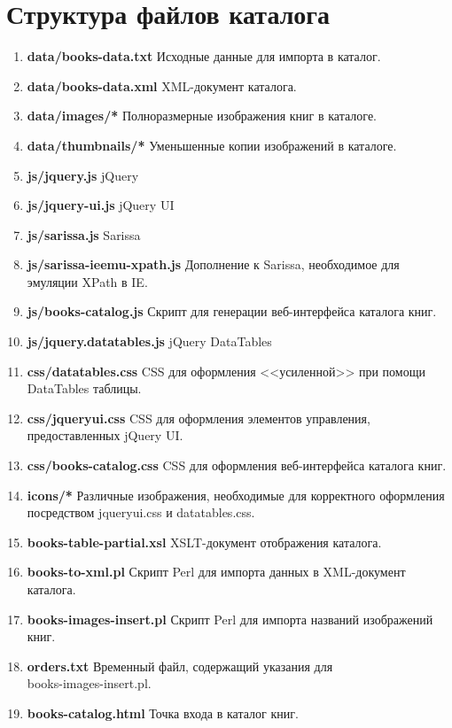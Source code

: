 \documentclass[a4paper,14pt,oneside]{extreport}
\begin{document}
\section{Структура файлов каталога}
\begin{enumerate}
\item \textbf{data/books-data.txt} Исходные данные для импорта в каталог.
\item \textbf{data/books-data.xml} XML-документ каталога.
\item \textbf{data/images/*} Полноразмерные изображения книг в каталоге.
\item \textbf{data/thumbnails/*} Уменьшенные копии изображений в каталоге.
\item \textbf{js/jquery.js} jQuery
\item \textbf{js/jquery-ui.js} jQuery UI
\item \textbf{js/sarissa.js} Sarissa
\item \textbf{js/sarissa-ieemu-xpath.js} Дополнение к Sarissa, необходимое для эмуляции XPath в IE.
\item \textbf{js/books-catalog.js} Скрипт для генерации веб-интерфейса каталога книг.
\item \textbf{js/jquery.datatables.js} jQuery DataTables
\item \textbf{css/datatables.css} CSS для оформления <<усиленной>> при помощи \\ DataTables таблицы.
\item \textbf{css/jqueryui.css} CSS для оформления элементов управления, предоставленных jQuery UI.
\item \textbf{css/books-catalog.css} CSS для оформления веб-интерфейса каталога книг.
\item \textbf{icons/*} Различные изображения, необходимые для корректного оформления посредством jqueryui.css и datatables.css.
\item \textbf{books-table-partial.xsl} XSLT-документ отображения каталога.
\item \textbf{books-to-xml.pl} Скрипт Perl для импорта данных в XML-документ каталога.
\item \textbf{books-images-insert.pl} Скрипт Perl для импорта названий изображений книг.
\item \textbf{orders.txt} Временный файл, содержащий указания для \\ books-images-insert.pl.
\item \textbf{books-catalog.html} Точка входа в каталог книг.
\end{enumerate}
\end{document}

